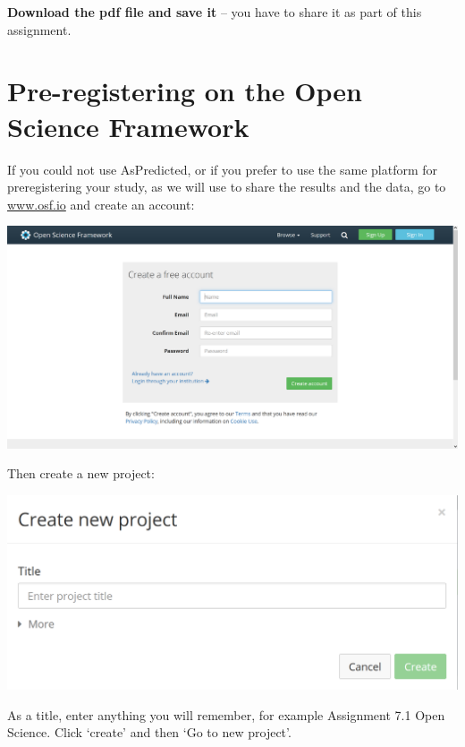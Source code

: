 \documentclass[
  oneside]{book}
\begin{document}
\textbf{Download the pdf file and save it} -- you have to share it as part of this
assignment.

\hypertarget{pre-registering-on-the-open-science-framework}{%
\section{Pre-registering on the Open Science Framework}\label{pre-registering-on-the-open-science-framework}}

If you could not use AsPredicted, or if you prefer to use the same platform for preregistering your study, as we will use to share the results and the data, go to \href{http://www.osf.io}{www.osf.io} and create an account:

\begin{center}\includegraphics[width=1\linewidth]{images/7d6b26f83fee88df8bd46f30f4441844} \end{center}

Then create a new project:

\begin{center}\includegraphics[width=1\linewidth]{images/2319f53e025e2b9c707f1062f478dc1a} \end{center}

As a title, enter anything you will remember, for example Assignment 7.1 Open
Science. Click `create' and then `Go to new project'.
\end{document}
